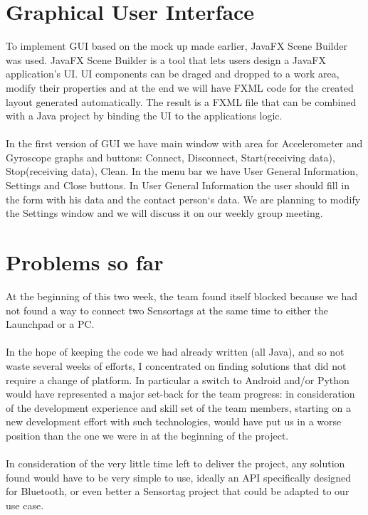 \documentclass[conference,12pt]{IEEETran}
\begin{document}
\section{Graphical User Interface} 
To implement GUI based on the mock up made earlier, JavaFX Scene Builder\cite{JavaFX} was used. JavaFX Scene Builder is a tool that lets users design a JavaFX application's UI. UI components can be draged and dropped to a work area, modify their properties and at the end we will have FXML code for the created layout generated automatically. The result is a FXML file that can be combined with a Java project by binding the UI to the applications logic. \\\\
In the first version of GUI we have main window with area for Accelerometer and Gyroscope graphs and buttons: Connect, Disconnect, Start(receiving data), Stop(receiving data), Clean. In the menu bar we have User General Information, Settings and Close buttons. In User General Information the user should fill in the form with his data and the contact person`s data. We are planning to modify the Settings window and we will discuss it on our weekly group meeting.

\section{Problems so far}
At the beginning of this two week, the team found itself blocked because we had not found  a way to connect two Sensortags at the same time to either the Launchpad or a PC.\\\\
In the hope of keeping the code we had already written (all Java), and so not waste several weeks of efforts, I concentrated on finding solutions that did not require a change of platform. In particular a switch to Android and/or Python would have represented a major set-back for the team progress: in consideration of the development experience and skill set of the team members, starting on a new development effort with such technologies, would have put us in a worse position than the one we were in at the beginning of the project.\\\\
In consideration of the very little time left to deliver the project, any solution found would have to be very simple to use, ideally an API specifically designed for Bluetooth, or even better a Sensortag project that could be adapted to our use case.\\
\end{document}
